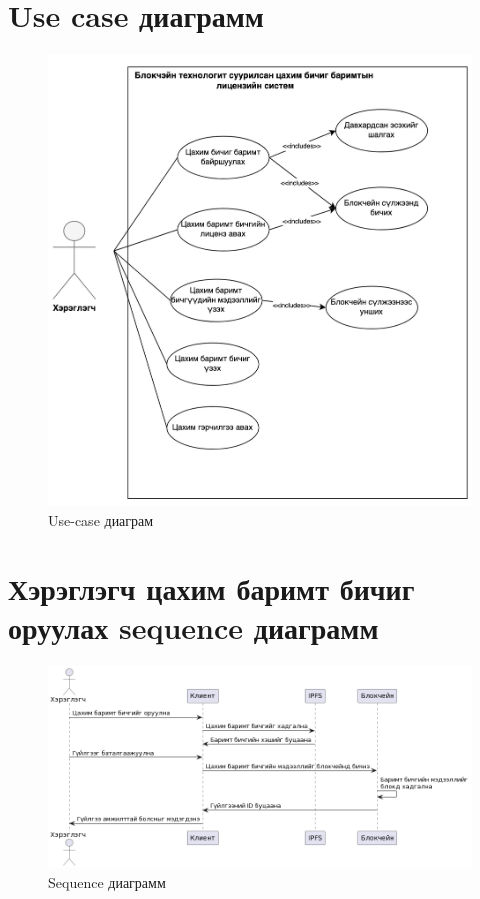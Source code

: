 \section{Use case диаграмм}
\begin{figure}[h!]
	\centering
	\includegraphics[scale=0.45]{src/images/usecase.png}
	\caption{Use-case диаграм}
\end{figure}

\pagebreak
\section{Хэрэглэгч цахим баримт бичиг оруулах sequence диаграмм}
\begin{figure}[h!]
	\centering
	\includegraphics[scale=0.6, angle=90]{src/images/sequence.png}
	\caption{Sequence диаграмм}
\end{figure}

